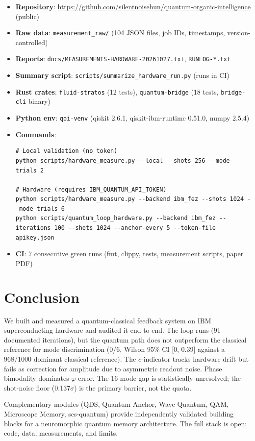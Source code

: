 \documentclass[sigconf,anonymous=false]{acmart}
\begin{document}
\begin{itemize}
\item \textbf{Repository}: \url{https://github.com/silentnoisehun/quantum-organic-intelligence} (public)
\item \textbf{Raw data}: \texttt{measurement\_raw/} (104 JSON files, job IDs, timestamps, version-controlled)
\item \textbf{Reports}: \texttt{docs/MEASUREMENTS-HARDWARE-20261027.txt}, \texttt{RUNLOG-*.txt}
\item \textbf{Summary script}: \texttt{scripts/summarize\_hardware\_run.py} (runs in CI)
\item \textbf{Rust crates}: \texttt{fluid-stratos} (12 tests), \texttt{quantum-bridge} (18 tests, \texttt{bridge-cli} binary)
\item \textbf{Python env}: \texttt{qoi-venv} (qiskit 2.6.1, qiskit-ibm-runtime 0.51.0, numpy 2.5.4)
\item \textbf{Commands}:
\begin{verbatim}
# Local validation (no token)
python scripts/hardware_measure.py --local --shots 256 --mode-trials 2

# Hardware (requires IBM_QUANTUM_API_TOKEN)
python scripts/hardware_measure.py --backend ibm_fez --shots 1024 --mode-trials 6
python scripts/quantum_loop_hardware.py --backend ibm_fez --iterations 100 --shots 1024 --anchor-every 5 --token-file apikey.json
\end{verbatim}
\item \textbf{CI}: 7 consecutive green runs (fmt, clippy, tests, measurement scripts, paper PDF)
\end{itemize}

\section{Conclusion}

We built and measured a quantum-classical feedback system on IBM superconducting hardware and audited it end to end. The loop runs (91 documented iterations), but the quantum path does not outperform the classical reference for mode discrimination (0/6, Wilson 95\% CI [0, 0.39] against a 968/1000 dominant classical reference). The $c$-indicator tracks hardware drift but fails as correction for amplitude due to asymmetric readout noise. Phase bimodality dominates $\varphi$ error. The 16-mode gap is statistically unresolved; the shot-noise floor (0.137$\sigma$) is the primary barrier, not the quota.

Complementary modules (QDS, Quantum Anchor, Wave-Quantum, QAM, Microscope Memory, scs-quantum) provide independently validated building blocks for a neuromorphic quantum memory architecture. The full stack is open: code, data, measurements, and limits.
\end{document}

